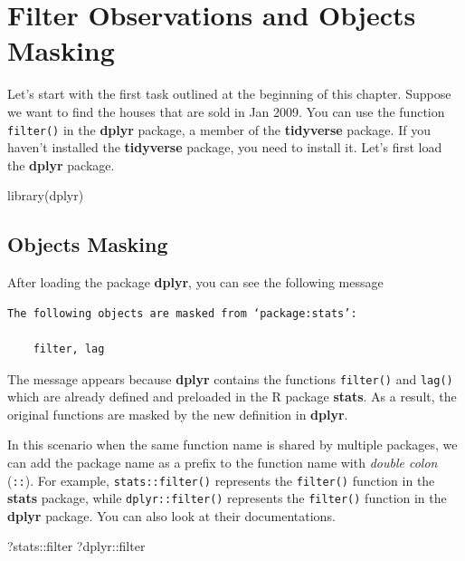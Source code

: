\documentclass[
]{book}
\newenvironment{Shaded}{\begin{snugshade}}{\end{snugshade}}
\newcommand{\FunctionTok}[1]{\textcolor[rgb]{0.00,0.00,0.00}{#1}}
\newcommand{\NormalTok}[1]{#1}
\newcommand{\SpecialCharTok}[1]{\textcolor[rgb]{0.00,0.00,0.00}{#1}}
\begin{document}
\hypertarget{filter-observations}{%
\section{Filter Observations and Objects Masking}\label{filter-observations}}

Let's start with the first task outlined at the beginning of this chapter. Suppose we want to find the houses that are sold in Jan 2009. You can use the function \texttt{filter()} in the \textbf{dplyr} package, a member of the \textbf{tidyverse} package. If you haven't installed the \textbf{tidyverse} package, you need to install it. Let's first load the \textbf{dplyr} package.

\begin{Shaded}
\begin{Highlighting}[]
\FunctionTok{library}\NormalTok{(dplyr)}
\end{Highlighting}
\end{Shaded}

\hypertarget{objects-masking}{%
\subsection{Objects Masking}\label{objects-masking}}

After loading the package \textbf{dplyr}, you can see the following message

\begin{verbatim}
The following objects are masked from ‘package:stats’:

    filter, lag
\end{verbatim}

The message appears because \textbf{dplyr} contains the functions \texttt{filter()} and \texttt{lag()} which are already defined and preloaded in the R package \textbf{stats}. As a result, the original functions are masked by the new definition in \textbf{dplyr}.

In this scenario when the same function name is shared by multiple packages, we can add the package name as a prefix to the function name with \emph{double colon} (\texttt{::}). For example, \texttt{stats::filter()} represents the \texttt{filter()} function in the \textbf{stats} package, while \texttt{dplyr::filter()} represents the \texttt{filter()} function in the \textbf{dplyr} package. You can also look at their documentations.

\begin{Shaded}
\begin{Highlighting}[]
\NormalTok{?stats}\SpecialCharTok{::}\NormalTok{filter}
\NormalTok{?dplyr}\SpecialCharTok{::}\NormalTok{filter}
\end{Highlighting}
\end{Shaded}
\end{document}
